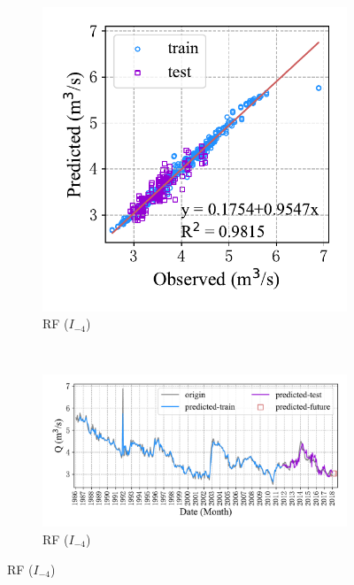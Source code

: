 \begin{figure}[!htbp]
\begin{subfigure}[b]{0.615\textwidth}
  \end{subfigure}
  \\
  \begin{subfigure}[b]{0.305\textwidth}
    \includegraphics[width=\textwidth]{Img/chap4_spr/spr_scatter_in_4_out_2_rf.pdf}
    \vspace{-1.2cm}
    \caption{RF ($I_{-4}$)}
    \label{fig:spr_scatter_in_4_out_2_rf}
  \end{subfigure}
  ~
  \begin{subfigure}[b]{0.615\textwidth}
    \includegraphics[width=\textwidth]{Img/chap4_spr/spr_series_in_4_out_2_rf.pdf}
    \vspace{-1.2cm}
    \caption{RF ($I_{-4}$)}
    \label{fig:spr_series_in_4_out_2_rf}
  \end{subfigure}
  \label{fig:spr_out_2}
\end{figure}

